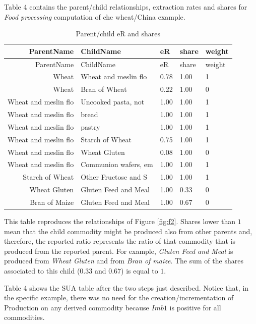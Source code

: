 \documentclass[]{article}
\begin{document}
Table 4 contains the parent/child relationships, extraction rates and
shares for \emph{Food processing} computation of che wheat/China
example.

\begin{longtable}[]{@{}rllll@{}}
\caption{Parent/child eR and shares}\tabularnewline
\toprule
ParentName & ChildName & eR & share & weight\tabularnewline
\midrule
\endfirsthead
\toprule
ParentName & ChildName & eR & share & weight\tabularnewline
\midrule
\endhead
Wheat & Wheat and meslin flo & 0.78 & 1.00 & 1\tabularnewline
Wheat & Bran of Wheat & 0.22 & 1.00 & 0\tabularnewline
Wheat and meslin flo & Uncooked pasta, not & 1.00 & 1.00 &
1\tabularnewline
Wheat and meslin flo & bread & 1.00 & 1.00 & 1\tabularnewline
Wheat and meslin flo & pastry & 1.00 & 1.00 & 1\tabularnewline
Wheat and meslin flo & Starch of Wheat & 0.75 & 1.00 & 1\tabularnewline
Wheat and meslin flo & Wheat Gluten & 0.08 & 1.00 & 0\tabularnewline
Wheat and meslin flo & Communion wafers, em & 1.00 & 1.00 &
1\tabularnewline
Starch of Wheat & Other Fructose and S & 1.00 & 1.00 & 1\tabularnewline
Wheat Gluten & Gluten Feed and Meal & 1.00 & 0.33 & 0\tabularnewline
Bran of Maize & Gluten Feed and Meal & 1.00 & 0.67 & 0\tabularnewline
\bottomrule
\end{longtable}

This table reproduces the relationships of Figure \ref{fig:f2}. Shares
lower than \(1\) mean that the child commodity might be produced also
from other parents and, therefore, the reported ratio represents the
ratio of that commodity that is produced from the reported parent. For
example, \emph{Gluten Feed and Meal} is produced from \emph{Wheat
Gluten} and from \emph{Bran of maize}. The sum of the shares associated
to this child (\(0.33\) and \(0.67\)) is equal to \(1\).

Table 4 shows the SUA table after the two steps just described. Notice
that, in the specific example, there was no need for the
creation/incrementation of Production on any derived commodity because
\(Imb1\) is positive for all commodities.
\end{document}
